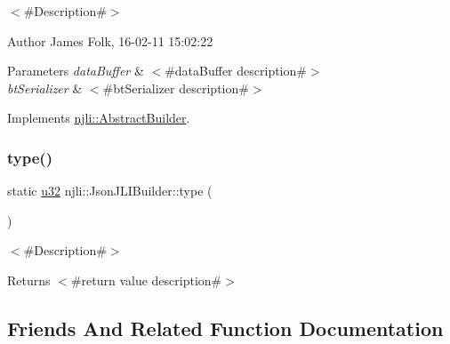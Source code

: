 $<$\#\+Description\#$>$ 

\begin{DoxyAuthor}{Author}
James Folk, 16-\/02-\/11 15\+:02\+:22
\end{DoxyAuthor}

\begin{DoxyParams}{Parameters}
{\em data\+Buffer} & $<$\#data\+Buffer description\#$>$ \\
\hline
{\em bt\+Serializer} & $<$\#bt\+Serializer description\#$>$ \\
\hline
\end{DoxyParams}


Implements \mbox{\hyperlink{classnjli_1_1_abstract_builder_ab66b774e02ccb9da554c9aab7fa6d981}{njli\+::\+Abstract\+Builder}}.

\mbox{\label{classnjli_1_1_json_j_l_i_builder_a78783614cf7ec5dd168d584fa6c4462c}} 
\subsubsection{\texorpdfstring{type()}{type()}}
{\footnotesize\ttfamily static \mbox{\hyperlink{_util_8h_a10e94b422ef0c20dcdec20d31a1f5049}{u32}} njli\+::\+Json\+J\+L\+I\+Builder\+::type (\begin{DoxyParamCaption}{ }\end{DoxyParamCaption})\hspace{0.3cm}{\ttfamily [static]}}

$<$\#\+Description\#$>$

\begin{DoxyReturn}{Returns}
$<$\#return value description\#$>$ 
\end{DoxyReturn}


\subsection{Friends And Related Function Documentation}
\mbox{\label{classnjli_1_1_json_j_l_i_builder_acb96ebb09abe8f2a37a915a842babfac}} 
